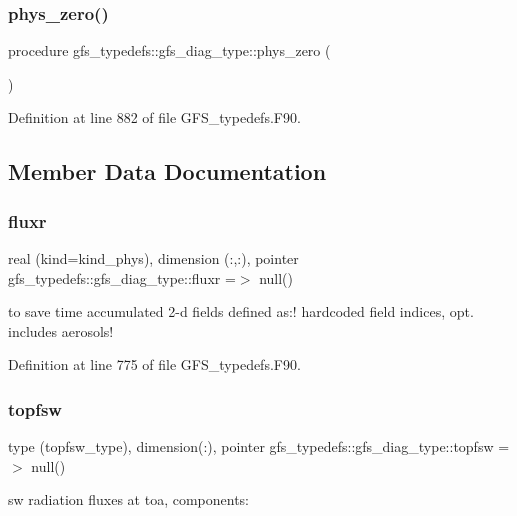 \subsubsection{phys\+\_\+zero()}
{\footnotesize\ttfamily procedure gfs\+\_\+typedefs\+::gfs\+\_\+diag\+\_\+type\+::phys\+\_\+zero (\begin{DoxyParamCaption}{ }\end{DoxyParamCaption})}



Definition at line 882 of file G\+F\+S\+\_\+typedefs.\+F90.



\subsection{Member Data Documentation}
\mbox{\label{structgfs__typedefs_1_1gfs__diag__type_a167dd71147ffc20d84ef50b57cd4e3af}} 
\subsubsection{fluxr}
{\footnotesize\ttfamily real (kind=kind\+\_\+phys), dimension (\+:,\+:), pointer gfs\+\_\+typedefs\+::gfs\+\_\+diag\+\_\+type\+::fluxr =$>$ null()}



to save time accumulated 2-\/d fields defined as\+:! hardcoded field indices, opt. includes aerosols! 



Definition at line 775 of file G\+F\+S\+\_\+typedefs.\+F90.

\mbox{\label{structgfs__typedefs_1_1gfs__diag__type_a00e4b54eb9b589ddafbfef53487a58d7}} 
\subsubsection{topfsw}
{\footnotesize\ttfamily type (topfsw\+\_\+type), dimension(\+:), pointer gfs\+\_\+typedefs\+::gfs\+\_\+diag\+\_\+type\+::topfsw =$>$ null()}



sw radiation fluxes at toa, components\+: 



